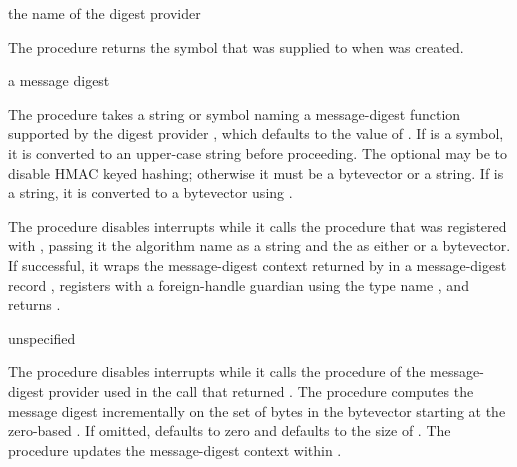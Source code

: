 \begin{procedure}
\end{procedure}
\returns{} the name of the digest provider

The  procedure returns the symbol
that was supplied to  when 
was created.

\begin{procedure}
\end{procedure}
\returns{} a message digest

The  procedure takes a string or symbol 
naming a message-digest function supported by the digest provider
, which defaults to the value of .
If  is a symbol, it is converted to an upper-case string
before proceeding.
The optional  may be  to disable HMAC keyed
hashing; otherwise it must be a bytevector or a string.
If  is a string, it is converted to a bytevector
using .

The  procedure disables interrupts while it calls the 
procedure that was registered with , passing it the
algorithm name as a string and the  as either  or a
bytevector.
If successful, it wraps the message-digest context returned by 
in a message-digest record , registers 
with a foreign-handle guardian using the type name ,
and returns .

\begin{procedure}
\end{procedure}
\returns{} unspecified

The  procedure disables interrupts while it calls the 
procedure of the message-digest provider used in the 
call that returned .
The  procedure computes the message digest incrementally
on the set of  bytes in the bytevector  starting at
the zero-based .
If omitted,  defaults to zero and  defaults
to the size of .
The  procedure updates the message-digest context within .

